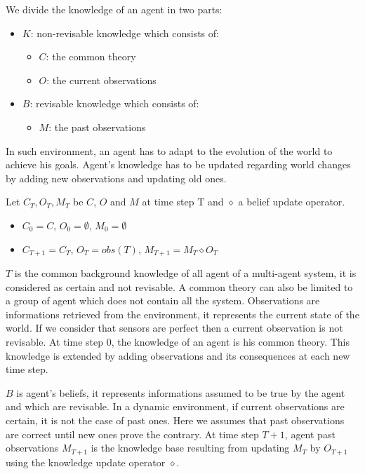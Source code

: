 \documentclass{aamas2012}
\begin{document}
	We divide the knowledge of an agent in two parts:
	\begin{itemize}
		\item $K$: non-revisable knowledge which consists of:
		\begin{itemize}
			\item $C$: the common theory
			\item $O$: the current observations
		\end{itemize}
		\item $B$: revisable knowledge which consists of:
		\begin{itemize}
			\item $M$: the past observations 
		\end{itemize}
	\end{itemize}
		
	In such environment, an agent has to adapt to the evolution of the world to achieve his goals.
	Agent's knowledge has to be updated regarding world changes by adding new observations and updating old ones.
	
	Let $C_{T}, O_{T}, M_{T}$ be $C$, $O$ and $M$ at time step T and $\diamond$ a belief update operator.
	\begin{itemize}
		\item $C_{0} = C$, $O_{0} = \emptyset$, $M_{0} = \emptyset$
		\item $C_{T+1} = C_{T}$, $O_{T} = obs(T)$, $M_{T+1} = M_{T} \diamond O_{T}$
	\end{itemize}
	
	$T$ is the common background knowledge of all agent of a multi-agent system, it is considered as certain and not revisable.
	A common theory can also be limited to a group of agent which does not contain all the system.
	Observations are informations retrieved from the environment, it represents the current state of the world.
	If we consider that sensors are perfect then a current observation is not revisable.
	At time step 0, the knowledge of an agent is his common theory.
	This knowledge is extended by adding observations and its consequences at each new time step.

	$B$ is agent's beliefs, it represents informations assumed to be true by the agent and which are revisable.
	In a dynamic environment, if current observations are certain, it is not the case of past ones.
	Here we assumes that past observations are correct until new ones prove the contrary.
	At time step $T+1$, agent past observations $M_{T+1}$ is the knowledge base resulting from updating $M_{T}$ by $O_{T+1}$ using the knowledge update operator $\diamond$.
\end{document}
